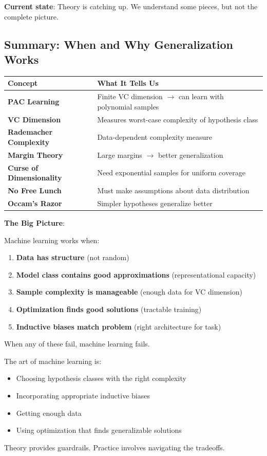 \textbf{Current state}: Theory is catching up. We understand some pieces, but not the complete picture.

\subsection{Summary: When and Why Generalization Works}

\begin{table}[h]
\centering
\begin{tabular}{ll}
\toprule
\textbf{Concept} & \textbf{What It Tells Us} \\
\midrule
\textbf{PAC Learning} & Finite VC dimension $\rightarrow$ can learn with polynomial samples \\
\textbf{VC Dimension} & Measures worst-case complexity of hypothesis class \\
\textbf{Rademacher Complexity} & Data-dependent complexity measure \\
\textbf{Margin Theory} & Large margins $\rightarrow$ better generalization \\
\textbf{Curse of Dimensionality} & Need exponential samples for uniform coverage \\
\textbf{No Free Lunch} & Must make assumptions about data distribution \\
\textbf{Occam's Razor} & Simpler hypotheses generalize better \\
\bottomrule
\end{tabular}
\end{table}

\textbf{The Big Picture}:

Machine learning works when:
\begin{enumerate}
    \item \textbf{Data has structure} (not random)
    \item \textbf{Model class contains good approximations} (representational capacity)
    \item \textbf{Sample complexity is manageable} (enough data for VC dimension)
    \item \textbf{Optimization finds good solutions} (tractable training)
    \item \textbf{Inductive biases match problem} (right architecture for task)
\end{enumerate}

When any of these fail, machine learning fails.

The art of machine learning is:
\begin{itemize}
    \item Choosing hypothesis classes with the right complexity
    \item Incorporating appropriate inductive biases
    \item Getting enough data
    \item Using optimization that finds generalizable solutions
\end{itemize}

Theory provides guardrails. Practice involves navigating the tradeoffs.
